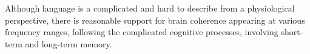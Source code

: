 
Although language is a complicated and hard to describe from a physiological perspective, there is reasonable support for brain coherence appearing at various frequency ranges, following the complicated cognitive processes, involving short-term and long-term memory.





%
%

